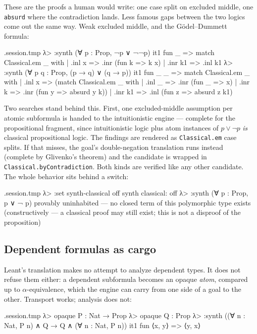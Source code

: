 \documentclass[11pt,oneside]{article}
\newcommand{\code}[1]{\texttt{#1}}
\newenvironment{session}
 {\VerbatimEnvironment\begin{VerbatimOut}{\jobname.session.tmp}}
 {\end{VerbatimOut}%
  \begin{sessionouter}%
  \VerbatimInput[fontsize=\footnotesize, breaklines=true,
    breaksymbolleft={\textcolor{stone}{\footnotesize$\hookrightarrow$}},
    formatcom=\color{ink}, tabsize=4]{\jobname.session.tmp}%
  \end{sessionouter}}
\begin{document}
These are the proofs a human would write: one case split on excluded
middle, one \code{absurd} where the contradiction lands. Less famous
gaps between the two logics come out the same way. Weak excluded
middle, and the G\"odel--Dummett formula:

\begin{session}
λ> :synth (∀ p : Prop, ¬p ∨ ¬¬p)
  it1  fun _ => match Classical.em _ with | .inl x => .inr (fun k => k x) | .inr k1 => .inl k1
λ> :synth (∀ p q : Prop, (p → q) ∨ (q → p))
  it1  fun _ _ => match Classical.em _ with | .inl x => (match Classical.em _ with | .inl _ => .inr (fun _ => x) | .inr k => .inr (fun y => absurd y k)) | .inr k1 => .inl (fun z => absurd z k1)
\end{session}

Two searches stand behind this. First, one excluded-middle assumption
per atomic subformula is handed to the intuitionistic engine ---
complete for the propositional fragment, since intuitionistic logic
plus atom instances of $p \vee \neg p$ \emph{is} classical
propositional logic. The findings are rendered as \code{Classical.em}
case splits. If that misses, the goal's double-negation translation runs
instead (complete by Glivenko's theorem) and the candidate is wrapped
in \code{Classical.byContradiction}. Both kinds are verified like any
other candidate. The whole behavior sits behind a switch:

\begin{session}
λ> :set synth-classical off
synth classical: off
λ> :synth (∀ p : Prop, p ∨ ¬ p)
provably uninhabited — no closed term of this polymorphic type exists
(constructively — a classical proof may still exist; this is not a disproof of the proposition)
\end{session}

\subsection{Dependent formulas as cargo}\label{sec:dependent}

Leant's translation makes no attempt to analyze dependent types.
It does not refuse them either: a dependent subformula becomes an
opaque \emph{atom}, compared up to $\alpha$-equivalence, which the
engine can carry from one side of a goal to the other. Transport
works; analysis does not:

\begin{session}
λ> opaque P : Nat → Prop
λ> opaque Q : Prop
λ> :synth ((∀ n : Nat, P n) ∧ Q → Q ∧ (∀ n : Nat, P n))
  it1  fun ⟨x, y⟩ => ⟨y, x⟩
\end{session}
\end{document}
